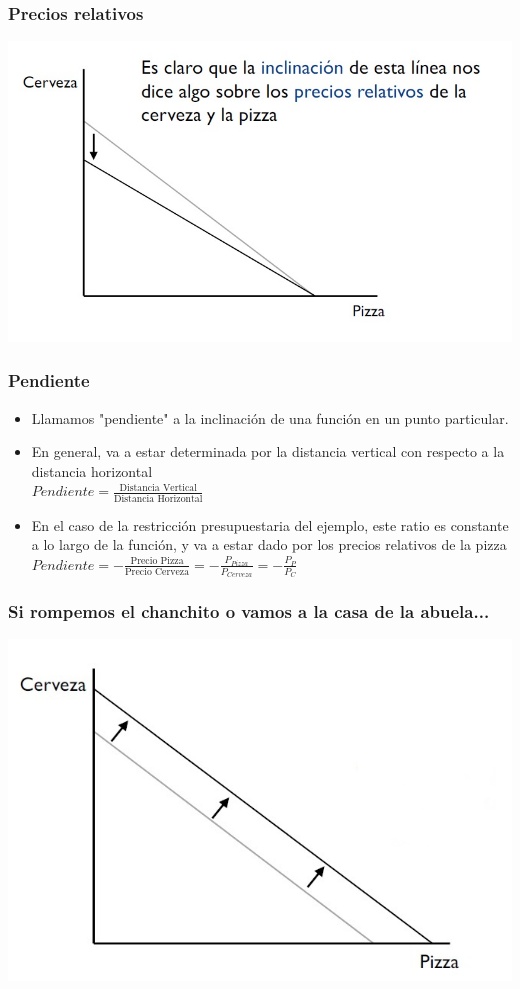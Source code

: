 \documentclass{beamer}
\begin{document}
\begin{frame}
\frametitle{Precios relativos}
\centering
\includegraphics[scale=0.55]{Figures/Tema_02.8_rp6.jpg}
\end{frame}

\begin{frame}
\frametitle{Pendiente}
\begin{itemize}
    \item Llamamos "pendiente" a la inclinación de una función en un punto particular.
    \item En general, va a estar determinada por la distancia vertical con respecto a la distancia horizontal \\
    $Pendiente = \frac{\text{Distancia Vertical}}{\text{Distancia Horizontal}}$
    \item En el caso de la restricción presupuestaria del ejemplo, este ratio es constante a lo largo de la función, y va a estar dado por los precios relativos de la pizza
    $Pendiente = - \frac{\text{Precio Pizza}}{\text{Precio Cerveza}}= -\frac{P_{Pizza}}{P_{Cerveza}}=-\frac{P_P}{P_C}$
\end{itemize} 
\end{frame}

\begin{frame}
\frametitle{ Si rompemos el chanchito o vamos a la casa de la abuela...}
\centering
\includegraphics[scale=0.55]{Figures/Tema_02.9_rp7.jpg}
\end{frame}
\end{document}
